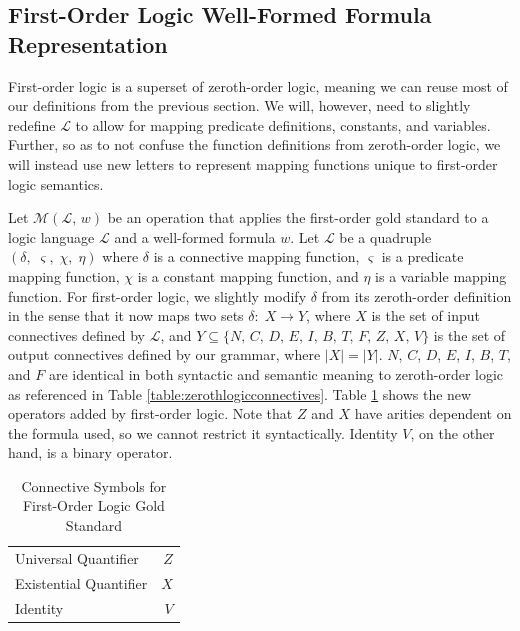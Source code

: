 \documentclass[ms]{uncgdissertationexp2}
\theoremstyle{plain}
\theoremstyle{definition}
\theoremstyle{remark}
\begin{document}
\subsection{First-Order Logic Well-Formed Formula Representation}
First-order logic is a superset of zeroth-order logic, meaning we can reuse most of our definitions from the previous section. We will, however, need to slightly redefine $\mathcal{L}$ to allow for mapping predicate definitions, constants, and variables. Further, so as to not confuse the function definitions from zeroth-order logic, we will instead use new letters to represent mapping functions unique to first-order logic semantics.

Let $\mathcal{M}(\mathcal{L},\,w)$ be an operation that applies the first-order gold standard to a logic language $\mathcal{L}$ and a well-formed formula $w$. Let $\mathcal{L}$ be a quadruple $(\delta,\;\varsigma,\;\chi,\;\eta)$ where $\delta$ is a connective mapping function, $\varsigma$ is a predicate mapping function, $\chi$ is a constant mapping function, and $\eta$ is a variable mapping function. 
For first-order logic, we slightly modify $\delta$ from its zeroth-order definition in the sense that it now maps two sets $\delta:\;X \to Y$, where $X$ is the set of input connectives defined by $\mathcal{L}$, and $Y \subseteq \{N,\,C,\,D,\,E,\,I,\,B,\,T,\,F,\,Z,\,X,\,V\}$ is the set of output connectives defined by our grammar, where $|X| = |Y|$. $N$, $C$, $D$, $E$, $I$, $B$, $T$, and $F$ are identical in both syntactic and semantic meaning to zeroth-order logic as referenced in Table \ref{table:zerothlogicconnectives}. Table \ref{table:firstlogicconnectives} shows the new operators added by first-order logic. Note that $Z$ and $X$ have arities dependent on the formula used, so we cannot restrict it syntactically. Identity $V$, on the other hand, is a binary operator.
\begin{table}[!ht]
	\caption{Connective Symbols for First-Order Logic Gold Standard}
	\label{table:firstlogicconnectives}
	\centering
	\begin{tabular}{lr}
	  \toprule
	  \thead{Semantic Meaning}&\thead{Connective Symbol}\\
	  \midrule
	  Universal Quantifier&$Z$\\
	  Existential Quantifier&$X$\\
	  Identity&$V$\\
	\bottomrule
  \end{tabular}
\end{table}
\end{document}
